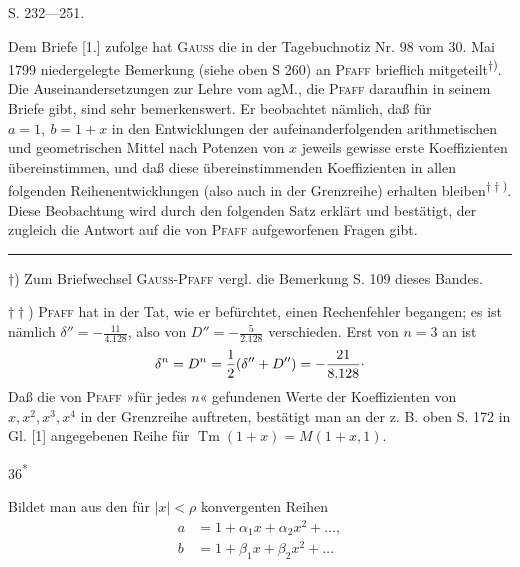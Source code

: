 \begingroup
\fancyhead{}
\begin{center} S. 232—251.\end{center}
\par\indent Dem Briefe [1.] zufolge hat \textsc{Gauss} die in der Tagebuchnotiz Nr. 98 vom 30. Mai 1799 niedergelegte Bemerkung (siehe oben S 260) an \textsc{Pfaff} brieflich mitgeteilt\textsuperscript{$\dagger$)}. Die Auseinandersetzungen zur Lehre vom agM., die \textsc{Pfaff} daraufhin in seinem Briefe gibt, sind sehr bemerkenswert. Er beobachtet nämlich, daß für $a=1,\ b=1+x$ in den Entwicklungen der aufeinanderfolgenden arithmetischen und geometrischen Mittel nach Potenzen von $x$ jeweils gewisse erste Koeffizienten übereinstimmen, und daß diese übereinstimmenden Koeffizienten in allen folgenden Reihenentwicklungen (also auch in der Grenzreihe) erhalten bleiben\textsuperscript{$\dagger\dagger$)}. Diese Beobachtung wird durch den folgenden Satz erklärt und bestätigt, der zugleich die Antwort auf die von \textsc{Pfaff} aufgeworfenen Fragen gibt.
\par\smallskip\noindent\rule{.25\linewidth}{.4pt}\par
{\small
\par\indent $\dagger$) Zum Briefwechsel \textsc{Gauss-Pfaff} vergl. die Bemerkung S. 109 dieses Bandes.
\par\indent $\dagger\dagger$) \textsc{Pfaff} hat in der Tat, wie er befürchtet, einen Rechenfehler begangen; es ist nämlich $\delta''=-\frac{11}{4.128}$, also von $D''=-\frac5{2.128}$ verschieden. Erst von $n=3$ an ist
\[\delta^n=D^n=\frac12(\delta''+D'')=-\frac{21}{8.128}\mathpunct{\raisebox{.5ex}{.}}\]
\noindent Daß die von \textsc{Pfaff} »für jedes $n$« gefundenen Werte der Koeffizienten von $x,x^2,x^3,x^4$ in der Grenzreihe auftreten, bestätigt man an der z. B. oben S. 172 in Gl. [1] angegebenen Reihe für $\operatorname{Tm}(1+x)=M(1+x,1)$.
\par}
\par\smallskip\hfill36\textsuperscript{*}\par
\clearpage
{}
\par\indent Bildet man aus den für $|x|<\rho$ konvergenten Reihen
\[\begin{aligned}
a&=1+\alpha_1x+\alpha_2x^2+\ldots,\\
b&=1+\beta_1x+\beta_2x^2+\ldots
\end{aligned}\]
